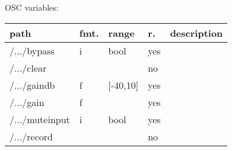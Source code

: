 \begin{snugshade}
{\footnotesize
\label{osctab:tascaraploopmachine}
OSC variables:
\nopagebreak

\begin{tabularx}{\textwidth}{llllX}
\hline
path & fmt. & range & r. & description\\
\hline
/.../bypass & i & bool & yes & \\
/.../clear &  &  & no & \\
/.../gaindb & f & [-40,10] & yes & \\
/.../gain & f &  & yes & \\
/.../muteinput & i & bool & yes & \\
/.../record &  &  & no & \\
\hline
\end{tabularx}
}
\end{snugshade}
